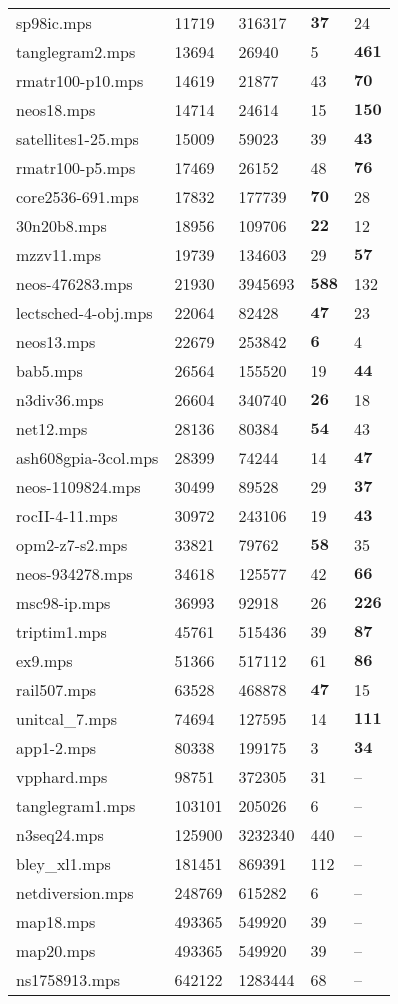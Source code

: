 \documentclass{article}
\begin{document}
\begin{longtable}{|l |l |l |l |l |}
sp98ic.mps&11719&316317&$\mathbf{37}$&24\\
tanglegram2.mps&13694&26940&5&$\mathbf{461}$\\
rmatr100-p10.mps&14619&21877&43&$\mathbf{70}$\\
neos18.mps&14714&24614&15&$\mathbf{150}$\\
satellites1-25.mps&15009&59023&39&$\mathbf{43}$\\
rmatr100-p5.mps&17469&26152&48&$\mathbf{76}$\\
core2536-691.mps&17832&177739&$\mathbf{70}$&28\\
30n20b8.mps&18956&109706&$\mathbf{22}$&12\\
mzzv11.mps&19739&134603&29&$\mathbf{57}$\\
neos-476283.mps&21930&3945693&$\mathbf{588}$&132\\
lectsched-4-obj.mps&22064&82428&$\mathbf{47}$&23\\
neos13.mps&22679&253842&$\mathbf{6}$&4\\
bab5.mps&26564&155520&19&$\mathbf{44}$\\
n3div36.mps&26604&340740&$\mathbf{26}$&18\\
net12.mps&28136&80384&$\mathbf{54}$&43\\
ash608gpia-3col.mps&28399&74244&14&$\mathbf{47}$\\
neos-1109824.mps&30499&89528&29&$\mathbf{37}$\\
rocII-4-11.mps&30972&243106&19&$\mathbf{43}$\\
opm2-z7-s2.mps&33821&79762&$\mathbf{58}$&35\\
neos-934278.mps&34618&125577&42&$\mathbf{66}$\\
msc98-ip.mps&36993&92918&26&$\mathbf{226}$\\
triptim1.mps&45761&515436&39&$\mathbf{87}$\\
ex9.mps&51366&517112&61&$\mathbf{86}$\\
rail507.mps&63528&468878&$\mathbf{47}$&15\\
unitcal_7.mps&74694&127595&14&$\mathbf{111}$\\
app1-2.mps&80338&199175&3&$\mathbf{34}$\\
vpphard.mps&98751&372305&31&--\\
tanglegram1.mps&103101&205026&6&--\\
n3seq24.mps&125900&3232340&440&--\\
bley_xl1.mps&181451&869391&112&--\\
netdiversion.mps&248769&615282&6&--\\
map18.mps&493365&549920&39&--\\
map20.mps&493365&549920&39&--\\
ns1758913.mps&642122&1283444&68&--\\
\hline
\end{longtable}
\end{document}
